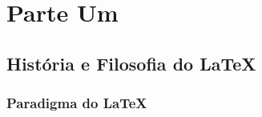 \documentclass[12pt, brazilian, a5paper]{abntex2} %
\begin{document}
\clearpage



\pagestyle{empty} %

\tableofcontents %

\cleardoublepage %

\pagestyle{fancy} %


\part{Parte Um}



\chapter{História e Filosofia do \LaTeX}

\section{Paradigma do \LaTeX}
\end{document}
